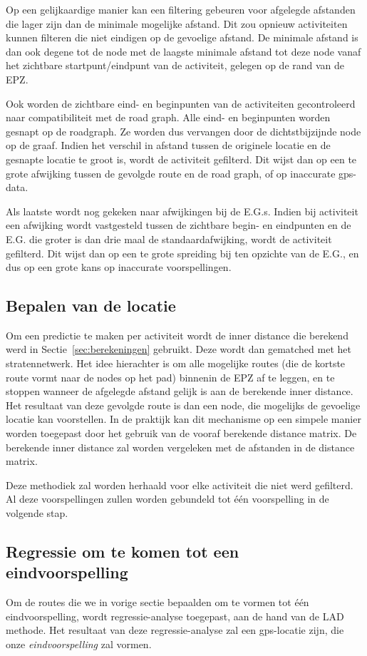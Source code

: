 Op een gelijkaardige manier kan een filtering gebeuren voor afgelegde afstanden
die lager zijn dan de minimale mogelijke afstand. Dit zou opnieuw activiteiten
kunnen filteren die niet eindigen op de gevoelige afstand. De minimale afstand
is dan ook degene tot de node met de laagste minimale afstand tot deze node
vanaf het zichtbare startpunt/eindpunt van de activiteit, gelegen op de rand
van de \ac{EPZ}.

Ook worden de zichtbare eind- en beginpunten van de activiteiten gecontroleerd
naar compatibiliteit met de road graph. Alle eind- en beginpunten worden
gesnapt op de roadgraph. Ze worden dus vervangen door de dichtstbijzijnde node
op de graaf. Indien het verschil in afstand tussen de originele locatie en de
gesnapte locatie te groot is, wordt de activiteit gefilterd. Dit wijst dan op
een te grote afwijking tussen de gevolgde route en de road graph, of op
inaccurate gps-data.

Als laatste wordt nog gekeken naar afwijkingen bij de \acp{E.G.}. Indien bij
activiteit een afwijking wordt vastgesteld tussen de zichtbare begin- en
eindpunten en de \ac{E.G.} die groter is dan drie maal de standaardafwijking,
wordt de activiteit gefilterd. Dit wijst dan op een te grote spreiding bij ten
opzichte van de \ac{E.G.}, en dus op een grote kans op inaccurate
voorspellingen.

\subsection{Bepalen van de locatie}
Om een predictie te maken per activiteit wordt de inner distance die berekend
werd in Sectie~\ref{sec:berekeningen} gebruikt. Deze wordt dan gematched met
het stratennetwerk. Het idee hierachter is om alle mogelijke routes (die de
kortste route vormt naar de nodes op het pad) binnenin de \ac{EPZ} af te
leggen, en te stoppen wanneer de afgelegde afstand gelijk is aan de berekende
inner distance. Het resultaat van deze gevolgde route is dan een node, die
mogelijks de gevoelige locatie kan voorstellen. In de praktijk kan dit
mechanisme op een simpele manier worden toegepast door het gebruik van de
vooraf berekende distance matrix. De berekende inner distance zal worden
vergeleken met de afstanden in de distance matrix.

Deze methodiek zal worden herhaald voor elke activiteit die niet werd
gefilterd. Al deze voorspellingen zullen worden gebundeld tot één voorspelling
in de volgende stap.

\subsection{Regressie om te komen tot een eindvoorspelling}
Om de routes die we in vorige sectie bepaalden om te vormen tot één
eindvoorspelling, wordt regressie-analyse toegepast, aan de hand van de
\ac{LAD} methode. Het resultaat van deze regressie-analyse zal een
\ac{gps}-locatie zijn, die onze \textit{eindvoorspelling} zal vormen.

